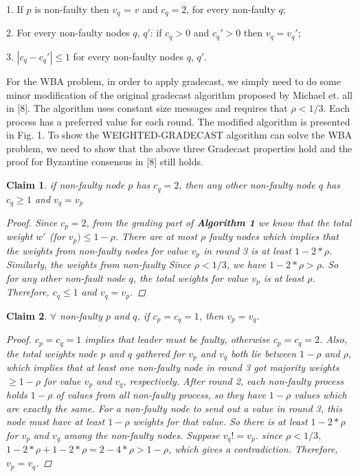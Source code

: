 \documentclass[conference]{IEEEtran}
\newtheorem{claim*}{Claim}
\begin{document}
1. If $p$ is non-faulty then $v_q$ = $v$ and $c_q = 2$, for every non-faulty $q$;

2. For every non-faulty nodes $q$, $q'$: if $c_q > 0$ and $c_q' > 0$ then $v_q = v_q'$;

3. $|c_q - c_q'| \leq 1$ for every non-faulty nodes $q$, $q'$.


For the WBA problem,  in order to apply gradecast, we simply need to do some minor modification of the original gradecast algorithm proposed by Michael et. all in [8]. The algorithm uses constant size messages and requires that $\rho < 1/3$. Each process has a preferred value for each round. The modified algorithm is presented in Fig. 1. To show the WEIGHTED-GRADECAST algorithm can solve the WBA problem, we need to show that the above three Gradecast properties hold and the proof for Byzantine consensus in [8] still holds. 
 
\begin{claim*}
if non-faulty node $p$ has $c_q = 2$, then any other non-faulty node $q$ has $c_q \geq 1$ and $v_q = v_p$
\begin{proof}
Since $c_p = 2$, from the grading part of \textbf{Algorithm 1} we know that the total weight $w'$ (for $v_p) \leq 1 - \rho$. There are at most $\rho$ faulty nodes which implies that the weights from non-faulty nodes for value $v_p$ in round 3 is at least $1 - 2*\rho$. Similarly,  the weights from non-faulty Since $\rho < 1/3$, we have $1 - 2*\rho > \rho$. So for any other non-fault node $q$, the total weights for value $v_p$ is at least $\rho$. Therefore, $c_q \leq 1$ and $v_q = v_p$.
\end{proof}
\end{claim*}


\begin{claim*}
$\forall$ non-faulty $p$ and $q$, if $c_p = c_q = 1$, then $v_p = v_q$. 
\begin{proof}
$c_p = c_q = 1$ implies that leader must be faulty, otherwise $c_p = c_q = 2$. Also, the total weights node $p$ and $q$ gathered for $v_p$ and $v_q$ both lie between $1 - \rho$ and $\rho$, which implies that at least one non-faulty node in round 3 got majority weights $\geq 1 - \rho$ for value $v_p$ and $v_q$, respectively. After round 2,  each non-faulty process holds $1 - \rho$ of values from all non-faulty process, so they have $1 - \rho$ values which are exactly the same. For a non-faulty node to send out a value in round 3, this node must have at least $1 - \rho$ weights for that value. So there is at least $1 - 2*\rho$ for $v_p$ and $v_q$ among the non-faulty nodes. Suppose $v_q != v_p$. since $\rho < 1/3$, $1 - 2*\rho + 1 - 2*\rho = 2 - 4*\rho > 1 - \rho$, which gives a contradiction. Therefore, $v_p = v_q$.
\end{proof}
\end{claim*}
\end{document}
